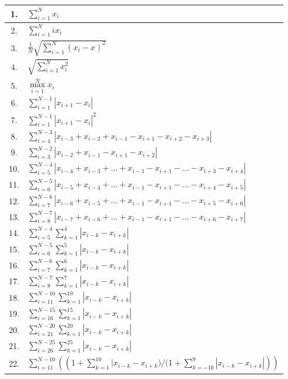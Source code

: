 \begin{longtable}{ |c|l| }
    	1.&$\sum \limits_{i=1}^{N}{x_i}$ \\ \hline
    	2.&$\sum \limits_{i=1}^{N}{ix_i}$\\ \hline
    	3.&$\frac{1}{N}\sqrt{\sum \limits_{i=1}^{N}{(x_i-\hat{x})^2}}$  \\ \hline
    	4.&$\sqrt{\sum \limits_{i=1}^{N}{x_i^2}}$  \\ \hline
    	5.&$\max \limits_{ i=1}^{N}{x_i}$  \\ \hline
    	6.&$\sum \limits_{i=1}^{N-1}{|{x_{i+1}-x_i}|}$  \\ \hline
    	7.&$\sum \limits_{i=1}^{N-1}{|{x_{i+1}-x_i}|}^2$  \\ \hline
    	8.&$\sum \limits_{i=4}^{N-3}{|{x_{i-3}+x_{i-2}+x_{i-1}-x_{i+1}-x_{i+2}-x_{i+3}}|}$  \\ \hline
    	9.&$\sum \limits_{i=3}^{N-2}{|{x_{i-2}+x_{i-1}-x_{i+1}-x_{i+2}}|}$  \\ \hline
    	10.&$\sum \limits_{i=5}^{N-4}{|{x_{i-4}+x_{i-3}+...+x_{i-1}-x_{i+1}-...-x_{i+3}-x_{i+4}}|}$  \\ \hline
    	11.&$\sum \limits_{i=6}^{N-5}{|{x_{i-5}+x_{i-4}+...+x_{i-1}-x_{i+1}-...-x_{i+4}-x_{i+5}}|}$  \\ \hline
    	12.&$\sum \limits_{i=7}^{N-6}{|{x_{i-6}+x_{i-5}+...+x_{i-1}-x_{i+1}-...-x_{i+5}-x_{i+6}}|}$  \\ \hline
    	13.&$\sum \limits_{i=8}^{N-7}{|{x_{i-7}+x_{i-6}+...+x_{i-1}-x_{i+1}-...-x_{i+6}-x_{i+7}}|}$  \\ \hline
    	14.&$\sum \limits_{i=5}^{N-4}\sum \limits_{k=1}^{4}{|{x_{i-k}-x_{i+k}}|}$  \\ \hline
    	15.&$\sum \limits_{i=6}^{N-5}\sum \limits_{k=1}^{5}{|{x_{i-k}-x_{i+k}}|}$  \\ \hline
    	16.&$\sum \limits_{i=7}^{N-6}\sum \limits_{k=1}^{6}{|{x_{i-k}-x_{i+k}}|}$  \\ \hline
    	17.&$\sum \limits_{i=8}^{N-7}\sum \limits_{k=1}^{7}{|{x_{i-k}-x_{i+k}}|}$  \\ \hline
    	18.&$\sum \limits_{i=11}^{N-10}\sum \limits_{k=1}^{10}{|{x_{i-k}-x_{i+k}}|}$  \\ \hline
    	19.&$\sum \limits_{i=16}^{N-15}\sum \limits_{k=1}^{15}{|{x_{i-k}-x_{i+k}}|}$  \\ \hline
    	20.&$\sum \limits_{i=21}^{N-20}\sum \limits_{k=1}^{20}{|{x_{i-k}-x_{i+k}}|}$  \\ \hline
    	21.&$\sum \limits_{i=26}^{N-25}\sum \limits_{k=1}^{25}{|{x_{i-k}-x_{i+k}}|}$  \\ \hline
    	22.&$\sum \limits_{i=11}^{N-10}((1+\sum \limits_{k=1}^{10}{|{x_{i-k}-x_{i+k}})/(1+\sum \limits_{k=-10}^{9}{|{x_{i-k}-x_{i+k}}|}}))$  \\ \hline

\end{longtable}
